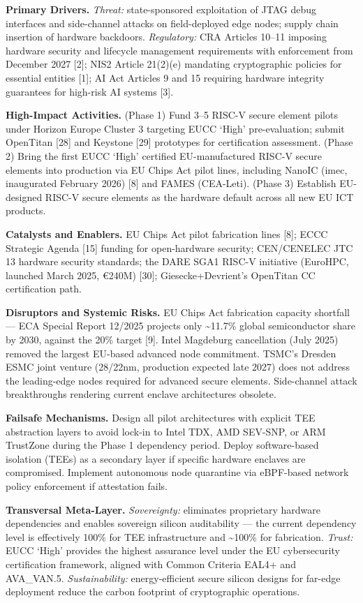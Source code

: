 \documentclass{ieeeaccess}
\begin{document}
\textbf{Primary Drivers.} \emph{Threat:} state-sponsored exploitation of
JTAG debug interfaces and side-channel attacks on field-deployed edge
nodes; supply chain insertion of hardware backdoors. \emph{Regulatory:}
CRA Articles 10--11 imposing hardware security and lifecycle management
requirements with enforcement from December 2027 {[}2{]}; NIS2 Article
21(2)(e) mandating cryptographic policies for essential entities
{[}1{]}; AI Act Articles 9 and 15 requiring hardware integrity
guarantees for high-risk AI systems {[}3{]}.

\textbf{High-Impact Activities.} (Phase 1) Fund 3--5 RISC-V secure
element pilots under Horizon Europe Cluster 3 targeting EUCC `High'
pre-evaluation; submit OpenTitan {[}28{]} and Keystone {[}29{]}
prototypes for certification assessment. (Phase 2) Bring the first EUCC
`High' certified EU-manufactured RISC-V secure elements into production
via EU Chips Act pilot lines, including NanoIC (imec, inaugurated
February 2026) {[}8{]} and FAMES (CEA-Leti). (Phase 3) Establish
EU-designed RISC-V secure elements as the hardware default across all
new EU ICT products.

\textbf{Catalysts and Enablers.} EU Chips Act pilot fabrication lines
{[}8{]}; ECCC Strategic Agenda {[}15{]} funding for open-hardware
security; CEN/CENELEC JTC 13 hardware security standards; the DARE SGA1
RISC-V initiative (EuroHPC, launched March 2025, €240M) {[}30{]};
Giesecke+Devrient's OpenTitan CC certification path.

\textbf{Disruptors and Systemic Risks.} EU Chips Act fabrication
capacity shortfall --- ECA Special Report 12/2025 projects only
\textasciitilde11.7\% global semiconductor share by 2030, against the
20\% target {[}9{]}. Intel Magdeburg cancellation (July 2025) removed
the largest EU-based advanced node commitment. TSMC's Dresden ESMC joint
venture (28/22nm, production expected late 2027) does not address the
leading-edge nodes required for advanced secure elements. Side-channel
attack breakthroughs rendering current enclave architectures obsolete.

\textbf{Failsafe Mechanisms.} Design all pilot architectures with
explicit TEE abstraction layers to avoid lock-in to Intel TDX, AMD
SEV-SNP, or ARM TrustZone during the Phase 1 dependency period. Deploy
software-based isolation (TEEs) as a secondary layer if specific
hardware enclaves are compromised. Implement autonomous node quarantine
via eBPF-based network policy enforcement if attestation fails.

\textbf{Transversal Meta-Layer.} \emph{Sovereignty:} eliminates
proprietary hardware dependencies and enables sovereign silicon
auditability --- the current dependency level is effectively 100\% for
TEE infrastructure and \textasciitilde100\% for fabrication.
\emph{Trust:} EUCC `High' provides the highest assurance level under the
EU cybersecurity certification framework, aligned with Common Criteria
EAL4+ and AVA\_VAN.5. \emph{Sustainability:} energy-efficient secure
silicon designs for far-edge deployment reduce the carbon footprint of
cryptographic operations.
\end{document}
